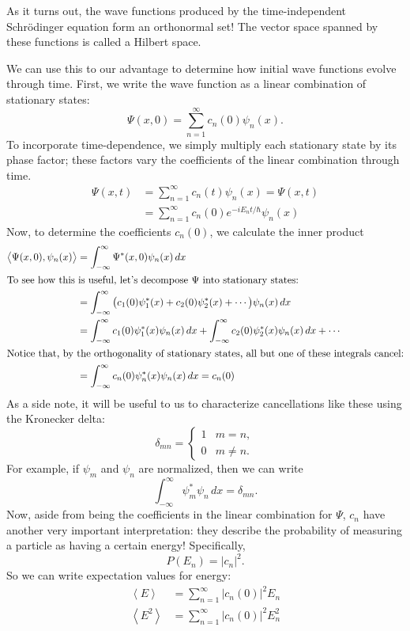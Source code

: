 \documentclass[../p052main.tex]{subfiles}
\begin{document}
As it turns out, the wave functions produced by the time-independent Schrödinger equation form an orthonormal set!
The vector space spanned by these functions is called a Hilbert space.

We can use this to our advantage to determine how initial wave functions evolve through time.
First, we write the wave function as a linear combination of stationary states:
\[ \Psi(x,0) = \sum_{n=1}^{\infty} c_n(0) \psi_n(x). \]
To incorporate time-dependence, we simply multiply each stationary state by its phase factor; these factors vary the coefficients of the linear combination through time.
\begin{align*}
    \Psi(x,t) &= \sum_{n=1}^{\infty} c_n(t) \psi_n(x) = \Psi(x,t) \\
    &= \sum_{n=1}^{\infty} c_n(0) e^{-iE_nt/\hbar} \psi_n(x)
\end{align*}
Now, to determine the coefficients $c_n(0)$, we calculate the inner product
\begin{align*}
    \big< \Psi(x,0), \psi_n(x) \big> &= \int_{-\infty}^{\infty} \Psi^*(x,0)\psi_n(x) \,dx \\
    \intertext{To see how this is useful, let's decompose $\Psi$ into stationary states:}
    &= \int_{-\infty}^{\infty} \big( c_1(0) \psi_1^*(x) + c_2(0) \psi_2^*(x) + \cdots \big) \psi_n(x) \,dx \\
    &= \int_{-\infty}^{\infty} c_1(0)\psi_1^*(x)\psi_n(x) \,dx + \int_{-\infty}^{\infty} c_2(0)\psi_2^*(x)\psi_n(x) \,dx + \cdots \\
    \intertext{Notice that, by the orthogonality of stationary states, all but one of these integrals cancel:}
    &= \int_{-\infty}^{\infty} c_n(0) \psi_n^*(x) \psi_n(x) \,dx = c_n(0)
\end{align*}
As a side note, it will be useful to us to characterize cancellations like these using the Kronecker delta:
\[ \delta_{mn} = \begin{cases} 1 & m = n, \\ 0 & m \neq n. \end{cases} \]
For example, if $\psi_m$ and $\psi_n$ are normalized, then we can write
\[ \int_{-\infty}^{\infty} \psi_m^*\psi_n \,dx = \delta_{mn}. \]
Now, aside from being the coefficients in the linear combination for $\Psi$, $c_n$ have another very important interpretation: they describe the probability of measuring a particle as having a certain energy!
Specifically,
\[ P(E_n) = |c_n|^2. \]
So we can write expectation values for energy:
\begin{align*}
    \left< E \right> &= \sum_{n=1}^{\infty} |c_n(0)|^2 E_n \\
    \left< E^2 \right> &= \sum_{n=1}^{\infty} |c_n(0)|^2 E_n^2
\end{align*}
\end{document}
